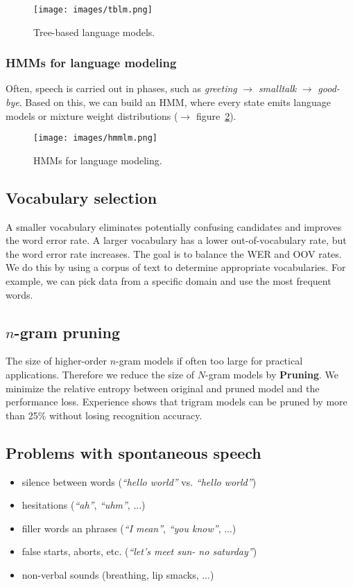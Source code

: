 \begin{figure}[htb]
\centering
\texttt{[image: images/tblm.png]}
\caption{\label{fig:treeBasedLM} Tree-based language models.}
\end{figure}

\subsubsection{HMMs for language modeling}

Often, speech is carried out in phases, such as \textit{greeting} $\rightarrow$ \textit{smalltalk} $\rightarrow$ \textit{good-bye}. Based on this, we can build an HMM, where every state emits language models or mixture weight distributions ($\to$ figure~\ref{fig:hmmLM}).

\begin{figure}[htb]
\centering
\texttt{[image: images/hmmlm.png]}
\caption{\label{fig:hmmLM} HMMs for language modeling.}
\end{figure}

\subsection{Vocabulary selection}
A smaller vocabulary eliminates potentially confusing candidates and improves the word error rate. A larger vocabulary has a lower out-of-vocabulary rate, but the word error rate increases. The goal is to balance the WER and OOV rates. We do this by using a corpus of text to determine appropriate vocabularies. For example, we can pick data from a specific domain and use the most frequent words.

\subsection{$n$-gram pruning}
The size of higher-order $n$-gram models if often too large for practical applications. Therefore we reduce the size of $N$-gram models by \textbf{Pruning}. We minimize the relative entropy between original and pruned model and the performance loss.
Experience shows that trigram models can be pruned by more than 25\% without losing recognition accuracy.

\subsection{Problems with spontaneous speech}
\begin{itemize}
    \item silence between words (\textit{``hello world''} vs. \textit{``hello \hspace{5pt} world''})
    \item hesitations (\textit{``ah''}, \textit{``uhm''}, ...)
    \item filler words an phrases (\textit{``I mean''}, \textit{``you know''}, ...)
    \item false starts, aborts, etc. (\textit{``let's meet sun- no saturday''})
    \item non-verbal sounds (breathing, lip smacks, ...)
\end{itemize}

